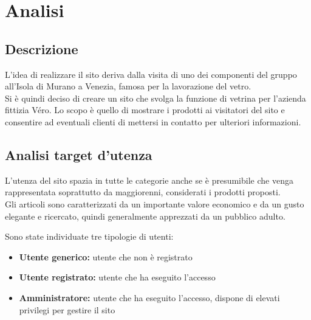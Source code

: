 \documentclass[a4paper, 11pt]{article}
\begin{document}
\pagebreak
\tableofcontents
\pagebreak


\section{Analisi}
\subsection{Descrizione}
L’idea di realizzare il sito deriva dalla visita di uno dei componenti del gruppo all’Isola di Murano a Venezia, famosa per la lavorazione del vetro. \\
Si è quindi deciso di creare un sito che svolga la funzione di vetrina per l’azienda fittizia Véro. Lo scopo è quello di mostrare i prodotti ai visitatori del sito e consentire ad eventuali clienti di mettersi in contatto per ulteriori informazioni. 


\subsection{Analisi target d'utenza}\label{analisi_utenza}
L’utenza del sito spazia in tutte le categorie anche se è presumibile che venga rappresentata soprattutto da maggiorenni, considerati i prodotti proposti. \\
Gli articoli sono caratterizzati da un importante valore economico e da un gusto elegante e ricercato, quindi generalmente apprezzati da un pubblico adulto.
\vspace{10pt}

Sono state individuate tre tipologie di utenti:
\begin{itemize}
\item \textbf{Utente generico:} utente che non è registrato
\item \textbf{Utente registrato:} utente che ha eseguito l'accesso
\item \textbf{Amministratore:} utente che ha eseguito l'accesso, dispone di elevati privilegi per gestire il sito
\end{itemize}
\end{document}

